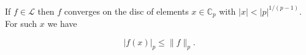 If $f \in \mathcal{L}$ then $f$ converges on the disc of elements $x \in \mathbb{C}_p$ with $|x| < |p|^{1/(p-1)}$. For such $x$ we have

$$|f(x)|_p \le \|f\|_p.$$
